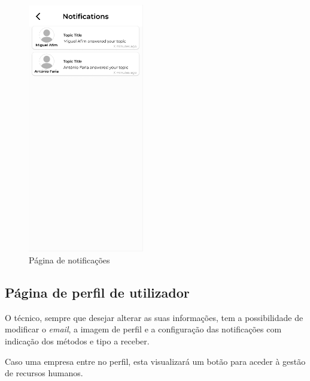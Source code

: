 \begin{figure}[htb]
  \centering
  \includegraphics[width=0.45\textwidth]{images/mockups/notifications.png}
  \caption{Página de notificações}
  \label{fig:29}
\end{figure}

\newpage

\subsection{Página de perfil de utilizador}

O técnico, sempre que desejar alterar as suas informações, tem a possibilidade de modificar o \textit{email}, a imagem de perfil e a configuração das notificações com indicação dos métodos e tipo a receber.

Caso uma empresa entre no perfil, esta visualizará um botão para aceder à gestão de recursos humanos.

